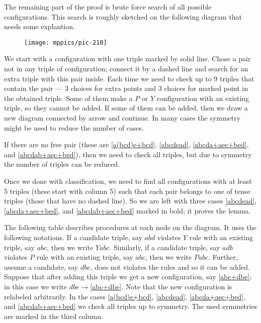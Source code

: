 \documentclass{article}
\begin{document}
The remaining part of the proof is brute force search of all possible configurations.
This search is roughly sketched on the following diagram that needs some explantion.
\begin{figure}[ht!]
\centering
\texttt{[image: mppics/pic-210]}
\end{figure}
We start with a configuration with one triple marked by solid line.
Chose a pair not in any triple of configuration;
connect it by a dashed line and search for an extra triple with this pair inside.
Each time we need to check up to 9 triples that contain the pair --- 3 choices for extra points and 3 choices for marked point in the obtained triple.
Some of them make a $P$ or $Y$ configuration with an existing triple, so they cannot be added.
If some of them can be added, then we draw a new diagram connected by arrow and continue.
In many cases the symmetry might be used to reduce the number of cases.
 

If there are no free pair (these are \ref{a(bcd)e+bcd}, \ref{abcdead}, \ref{abcda+aec+bed}, and \ref{abcdab+aec+bed}),
then we need to check all triples,
but due to symmetry the number of triples can be reduced.

Once we done with classification, we need to find all configurations with at least 5 triples (these start with column 5)
such that each pair belongs to one of tense triples (those that have no dashed line).
So we are left with three cases \ref{abcdead}, \ref{abcda+aec+bed}, and \ref{abcdab+aec+bed} marked in bold;
it proves the lemma.

The following table describes procedures at each node on the diagram.
It uses the following notations.
If a candidate triple, say $abd$ violates $Y$ rule with an existing triple, say $abc$, then we write $Yabc$.
Similarly, if a candidate triple, say $adb$ violates $P$ rule with an existing triple, say $abc$, then we write $Pabc$.
Further, assume a candidate, say $dbe$, does not violates the rules and so it can be added.
Suppose that after adding this triple we get a new configuration, say \ref{abc+dbe};
in this case we write $dbe{\to}$\ref{abc+dbe}.
Note that the new configuration is relabeled arbitrarily.
In the cases \ref{a(bcd)e+bcd}, \ref{abcdead}, \ref{abcda+aec+bed}, and \ref{abcdab+aec+bed} we check all triples up to symmetry.
The used symmetries are marked in the third column.


\setcounter{foo}{0}
\newcommand{\myitem}{\refstepcounter{foo}\thefoo}
\end{document}
